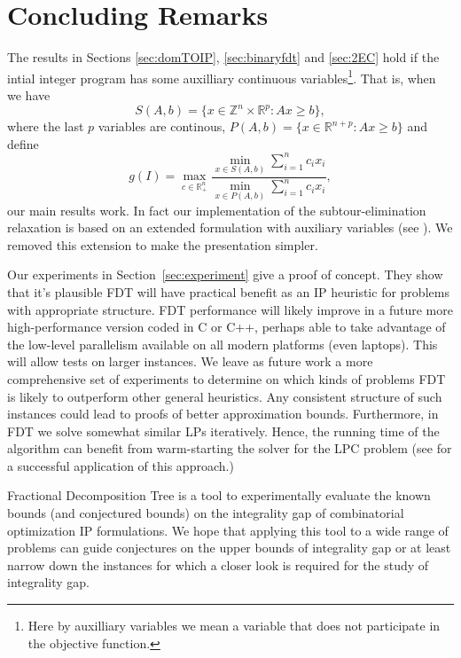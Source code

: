 \section{Concluding Remarks}

The results in Sections \ref{sec:domTOIP}, \ref{sec:binaryfdt}  and \ref{sec:2EC} hold if the intial integer program has some auxilliary continuous variables\footnote{Here by auxilliary variables we mean a variable that does not participate in the objective function.}. That is, when we have 
\begin{equation*}
S(A,b) = \{x\in \mathbb{Z}^n\times \mathbb{R}^p: Ax\geq b\},
\end{equation*}
where the last $p$ variables are continous, $P(A,b) = \{x\in \mathbb{R}^{n+p}: Ax\geq b\}$
and define
\begin{equation*}
g(I) = \max_{c\in \mathbb{R}^n_+}\frac{\min_{x\in S(A,b)} \sum_{i=1}^{n}c_ix_i}{\min_{x\in P(A,b)} \sum_{i=1}^{n}c_ix_i},
\end{equation*}
our main results work. In fact our implementation of the subtour-elimination relaxation is based on an extended formulation with auxiliary variables (see \cite{subtour-extended}). We removed this extension to make the presentation simpler.

Our experiments in Section~\ref{sec:experiment} give a proof of concept. They show that it's plausible FDT will have practical benefit as an IP heuristic for problems with appropriate structure. FDT performance will likely improve in a future more high-performance version coded in C or C++, perhaps able to take advantage of the low-level parallelism available on all modern platforms (even laptops).  This will allow tests on larger instances. We leave as future work a more comprehensive set of experiments to determine on which kinds of problems FDT is likely to outperform other general heuristics. Any consistent structure of such instances could lead to proofs of better approximation bounds. Furthermore, in FDT we solve somewhat similar LPs iteratively. Hence, the running time of the algorithm can benefit from warm-starting the solver for the LPC problem (see \cite{warmstart} for a successful application of this approach.)


Fractional Decomposition Tree is a tool to experimentally evaluate the known bounds (and conjectured bounds) on the integrality gap of combinatorial optimization IP formulations. We hope that applying this tool to a wide range of problems can guide conjectures on the upper bounds of integrality gap or at least narrow down the instances for which a closer look is required for the study of integrality gap.



